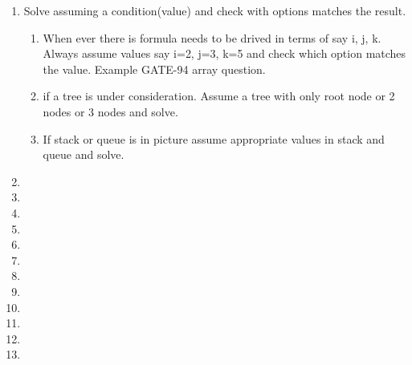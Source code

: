 \begin{enumerate}
    \item   Solve assuming a condition(value) and check with options matches the result.
        \begin{enumerate}
            \item When ever there is formula needs to be drived in terms of say i, j, k. Always assume values say i=2, j=3, k=5 and check which option matches the value. Example GATE-94 array question.
            \item if a tree is under consideration. Assume a tree with only root node or 2 nodes or 3 nodes and solve.
            \item If stack or queue is in picture assume appropriate values in stack and queue and solve.
    \end{enumerate}
    \item
    \item
    \item
    \item
    \item
    \item
    \item
    \item
    \item
    \item
    \item
    \item

\end{enumerate}
